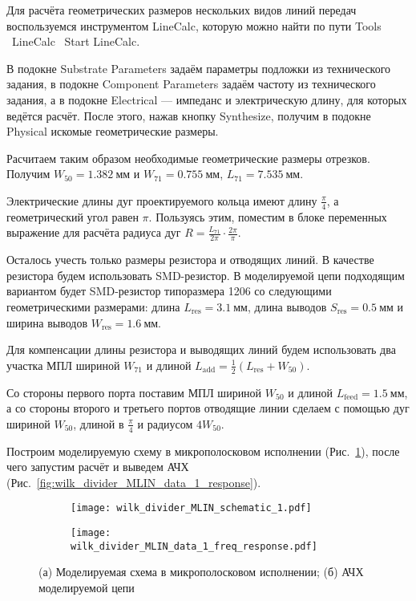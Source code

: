 Для расчёта геометрических размеров нескольких видов линий передач воспользуемся инструментом LineCalc, которую можно найти по пути Tools \textrightarrow\ LineCalc \textrightarrow\ Start LineCalc.

В подокне Substrate Parameters задаём параметры подложки из технического задания, в подокне Component Parameters задаём частоту из технического задания, а в подокне Electrical --- импеданс и электрическую длину, для которых ведётся расчёт.
После этого, нажав кнопку Synthesize, получим в подокне Physical искомые геометрические размеры.

Расчитаем таким образом необходимые геометрические размеры отрезков.
Получим $W_{50} = 1.382~\text{мм}$ и $W_{71} = 0.755~\text{мм}$, $L_\text{71} = 7.535~\text{мм}$.

Электрические длины дуг проектируемого кольца имеют длину $\frac{\pi}{4}$, а геометрический угол равен $\pi$.
Пользуясь этим, поместим в блоке переменных выражение для расчёта радиуса дуг $R = \frac{L_{71}}{2 \pi} \cdot \frac{2 \pi}{\pi}$.

Осталось учесть только размеры резистора и отводящих линий.
В качестве резистора будем использовать SMD-резистор.
В моделируемой цепи подходящим вариантом будет SMD-резистор типоразмера 1206 со следующими геометрическими размерами: длина $L_\text{res} = 3.1~\text{мм}$, длина выводов $S_\text{res} = 0.5~\text{мм}$ и ширина выводов $W_\text{res} = 1.6~\text{мм}$.

Для компенсации длины резистора и выводящих линий будем использовать два участка МПЛ шириной $W_{71}$ и длиной $L_\text{add} = \frac{1}{2} (L_\text{res} + W_{50})$.

Со стороны первого порта поставим МПЛ шириной $W_{50}$ и длиной $L_\text{feed} = 1.5~\text{мм}$, а со стороны второго и третьего портов отводящие линии сделаем с помощью дуг шириной $W_{50}$, длиной в $\frac{\pi}{4}$ и радиусом $4 W_{50}$.

Построим моделируемую схему в микрополосковом исполнении (Рис.~\ref{fig:wilk_divider_MLIN_schematic_1}), после чего запустим расчёт и выведем АЧХ (Рис.~\ref{fig:wilk_divider_MLIN_data_1_response}).

\begin{figure}[!ht]
    \centering
    \begin{subfigure}[b]{0.45\textwidth}
        \centering
        \texttt{[image: wilk\_divider\_MLIN\_schematic\_1.pdf]}
        \caption{}%
        \label{fig:wilk_divider_MLIN_schematic_1}
    \end{subfigure}
    \hfill
    \begin{subfigure}[b]{0.45\textwidth}
        \centering
        \texttt{[image: wilk\_divider\_MLIN\_data\_1\_freq\_response.pdf]}
        \caption{}%
        \label{fig:wilk_divider_MLIN_data_1_freq_response}
    \end{subfigure}
    \caption{%
        (а) Моделируемая схема в микрополосковом исполнении;
        (б) АЧХ моделируемой цепи
    }%
    \label{fig:wilk_divider_MLIN}
\end{figure}

